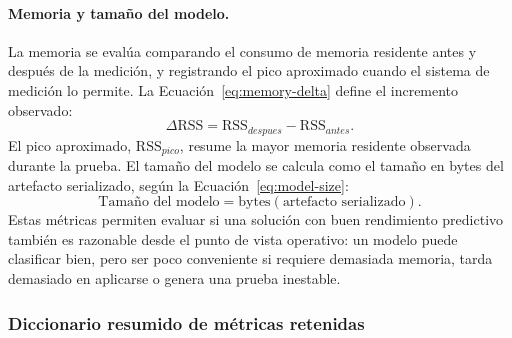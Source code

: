\documentclass[12pt,oneside]{report}
\begin{document}
\paragraph{Memoria y tamaño del modelo.}
La memoria se evalúa comparando el consumo de memoria residente antes y después de la medición, y registrando el pico aproximado cuando el sistema de medición lo permite. La Ecuación~\eqref{eq:memory-delta} define el incremento observado:
\begin{equation}
\label{eq:memory-delta}
\Delta \mathrm{RSS}=\mathrm{RSS}_{despues}-\mathrm{RSS}_{antes}.
\end{equation}
El pico aproximado, $\mathrm{RSS}_{pico}$, resume la mayor memoria residente observada durante la prueba. El tamaño del modelo se calcula como el tamaño en bytes del artefacto serializado, según la Ecuación~\eqref{eq:model-size}:
\begin{equation}
\label{eq:model-size}
\text{Tamaño del modelo}=\text{bytes}(\text{artefacto serializado}).
\end{equation}
Estas métricas permiten evaluar si una solución con buen rendimiento predictivo también es razonable desde el punto de vista operativo: un modelo puede clasificar bien, pero ser poco conveniente si requiere demasiada memoria, tarda demasiado en aplicarse o genera una prueba inestable.

\subsubsection{Diccionario resumido de métricas retenidas}
\end{document}
